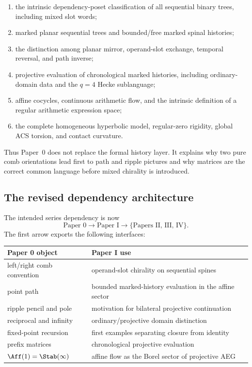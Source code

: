 \begin{enumerate}
  \item the intrinsic dependency-poset classification of all sequential binary
  trees, including mixed slot words;

  \item marked planar sequential trees and bounded/free marked spinal
  histories;

  \item the distinction among planar mirror, operand-slot exchange, temporal
  reversal, and path inverse;

  \item projective evaluation of chronological marked histories, including
  ordinary-domain data and the $q=4$ Hecke sublanguage;

  \item affine cocycles, continuous arithmetic flow, and the intrinsic
  definition of a regular arithmetic expression space;

  \item the complete homogeneous hyperbolic model, regular-zero rigidity,
  global ACS torsion, and contact curvature.
\end{enumerate}

Thus Paper~0 does not replace the formal history layer.  It explains why two
pure comb orientations lead first to path and ripple pictures and why matrices
are the correct common language before mixed chirality is introduced.

\subsection{The revised dependency architecture}

The intended series dependency is now
\[
  \boxed{
  \text{Paper 0}
  \longrightarrow
  \text{Paper I}
  \longrightarrow
  \{\text{Papers II, III, IV}\}.
  }
\]
The first arrow exports the following interfaces:

\begin{center}
\renewcommand{\arraystretch}{1.3}
\begin{tabular}{ll}
\toprule
Paper 0 object & Paper I use \\
\midrule
left/right comb convention & operand-slot chirality on sequential spines \\
point path & bounded marked-history evaluation in the affine sector \\
ripple pencil and pole & motivation for bilateral projective continuation \\
reciprocal and infinity & ordinary/projective domain distinction \\
fixed-point recursion & first examples separating closure from identity \\
prefix matrices & chronological projective evaluation \\
$\Aff(1)=\Stab(\infty)$ & affine flow as the Borel sector of projective AEG \\
\bottomrule
\end{tabular}
\end{center}

